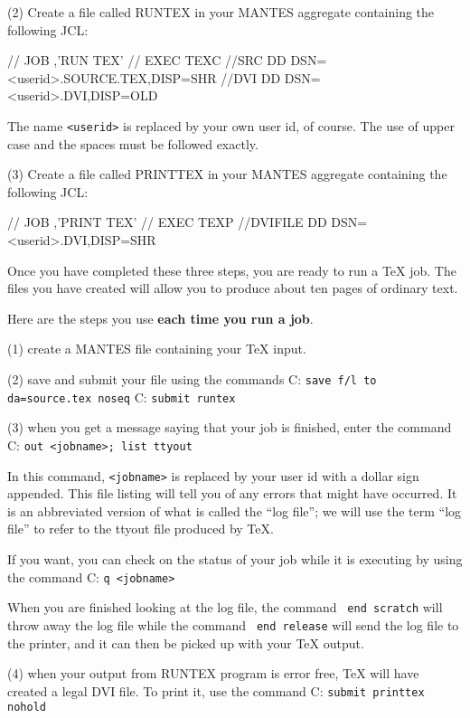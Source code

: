 \item{(2)} Create a file called RUNTEX in your MANTES aggregate 
containing the following JCL: 
 
\beginuser 
//        JOB  ,'RUN TEX' 
//        EXEC TEXC 
//SRC     DD DSN=<userid>.SOURCE.TEX,DISP=SHR 
//DVI     DD DSN=<userid>.DVI,DISP=OLD 
\enduser 
 
 
The name {\tt <userid>} is replaced by your own user id, of 
course. The use of upper case and the spaces must be followed 
exactly. 
 
\item{(3)} Create a file called PRINTTEX in your MANTES aggregate 
containing the following JCL: 
 
\beginuser 
//        JOB  ,'PRINT TEX' 
//        EXEC TEXP 
//DVIFILE DD DSN=<userid>.DVI,DISP=SHR 
\enduser 
 
 
Once you have completed these three steps, you are ready to run a 
\TeX{} job. The files you have created will allow you to produce 
about ten pages of ordinary text. 
 
Here are the steps you use {\bf each time you run a job}. 
 
\item{(1)} create a MANTES file containing your \TeX{} input. 
\item{(2)} save and submit your file using the commands 
\itemitem{} C: {\tt save f/l to da=source.tex noseq} 
\itemitem{} C: {\tt submit runtex} 
\item{(3)} when you get a message saying that your job is finished, 
enter the command 
\itemitem{} C: {\tt out <jobname>; list ttyout} 
 
In this command, {\tt <jobname>} is replaced by your user id with 
a dollar sign appended.  This file listing will tell you of any 
errors that might have occurred.  It is an abbreviated version of 
what is called the ``log file''; we will use the term ``log 
file'' to refer to the ttyout file produced by \TeX\null. 
 
If you want, you can check on the status of your job while it is 
executing by using the command 
\itemitem{} C: {\tt q <jobname>} 
 
When you are finished looking at the log file, the command {\tt 
end scratch} will throw away the log file while the command {\tt 
end release} will send the log file to the printer, and it can 
then be picked up with your \TeX{} output. 
 
\item{(4)} when your output from RUNTEX program is error free, \TeX{} 
will have created a legal DVI file.  To print it, use the 
command 
\itemitem{} C: {\tt submit printtex nohold} 
 
